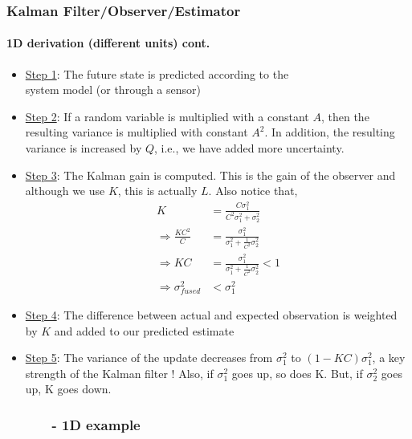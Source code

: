\documentclass{beamer}
\begin{document}
\begin{frame}
\frametitle{Kalman Filter/Observer/Estimator}
\framesubtitle{1D derivation (different units) \tiny cont.}

\begin{itemize}\scriptsize
\item \underline{Step 1}: The future state is predicted according to the\\ system model (or through a sensor)
\item \underline{Step 2}: If a random variable is multiplied with a constant $A$, then the resulting variance is multiplied with constant $A^2$.  In addition, the resulting variance is increased by $Q$, i.e., we have added more uncertainty.
\item \underline{Step 3}: The Kalman gain is computed.  This is the gain of the observer and although we use $K$, this is actually $L$.  Also notice that,
\begin{equation*}
\begin{array}{rlllll}
K&=\frac{C\sigma_1^2}{C^2\sigma_1^2+\sigma_2^2}\\
\Rightarrow \frac{KC^2}{C}&=\frac{\sigma_1^2}{\sigma_1^2+\frac{1}{C^2}\sigma_2^2}\\
\Rightarrow KC&=\frac{\sigma_1^2}{\sigma_1^2+\frac{1}{C^2}\sigma_2^2} <1\\
\Rightarrow \sigma^2_{fused}&<\sigma^2_1
\end{array}
\end{equation*}
\item \underline{Step 4}: The difference between actual and expected observation is weighted by $K$ and added to our predicted estimate
\item \underline{Step 5}: The variance of the update decreases from $\sigma^2_1$ to $(1-KC)\sigma^2_1$, a key strength of the Kalman filter !  Also, if $\sigma^2_1$ goes up, so does K.  But, if $\sigma^2_2$ goes up, K goes down.  
\end{itemize}
\end{frame}



\subsubsection{\ \ \ \ \ \ - 1D example}
\end{document}
